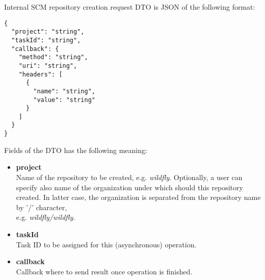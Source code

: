 \documentclass[../main.tex]{subfiles}
\begin{document}
Internal SCM repository creation request DTO is JSON of the following format:

\begin{lstlisting}[numbers=none]
{
  "project": "string",
  "taskId": "string",
  "callback": {
    "method": "string",
    "uri": "string",
    "headers": [
      {
        "name": "string",
        "value": "string"
      }
    ]
  }
}
\end{lstlisting}

Fields of the DTO has the following meaning:
\begin{itemize}
    \item \textbf{project}\\
    Name of the repository to be created, e.g. \textit{wildfly}. Optionally, a user can specify also name of the organization under which should this repository created. In latter case, the organization is separated from the repository name by '/' character,\\
    e.g. \textit{wildfly/wildfly}.

    \item \textbf{taskId}\\
    Task ID to be assigned for this (asynchronous) operation.

    \item \textbf{callback}\\
    Callback where to send result once operation is finished.
\end{itemize}
\end{document}
